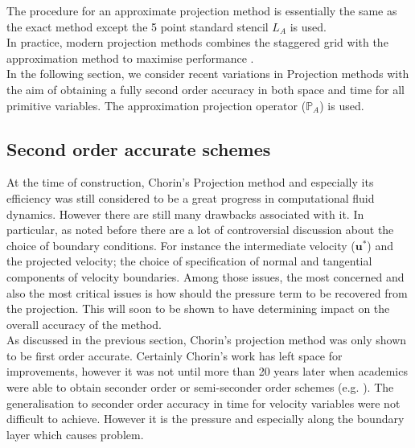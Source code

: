 The procedure for an approximate projection method is essentially the same as the exact method except the 5 point standard stencil $\textit{L}_A$ is used.\\

In practice, modern projection methods combines the staggered grid with the approximation method to maximise performance \cite{brown2001accurate}.\\

In the following section, we consider recent variations in Projection methods with the aim of obtaining a fully second order accuracy in both space and time for all primitive variables. The approximation projection operator ($\mathbb{P}_A$) is used.\\

\subsection{Second order accurate schemes}

At the time of construction, Chorin's Projection method and especially its efficiency was still considered to be a great progress in computational fluid dynamics. However there are still many drawbacks associated with it. In particular, as noted before there are a lot of controversial discussion about the choice of boundary conditions. For instance the intermediate velocity ($\textbf{u}^*$) and the projected velocity; the choice of specification of normal and tangential components of velocity boundaries. Among those issues, the most concerned and also the most critical issues is how should the pressure term to be recovered from the projection. This will soon to be shown to have determining impact on the overall accuracy of the method.\\

As discussed in the previous section, Chorin's projection method was only shown to be first order accurate. Certainly Chorin's work has left space for improvements, however it was not until more than 20 years later when academics were able to obtain seconder order or semi-seconder order schemes (e.g. \cite{kim1985application,bell1989second}). The generalisation to seconder order accuracy in time for velocity variables were not difficult to achieve. However it is the pressure and especially along the boundary layer which causes problem. 

